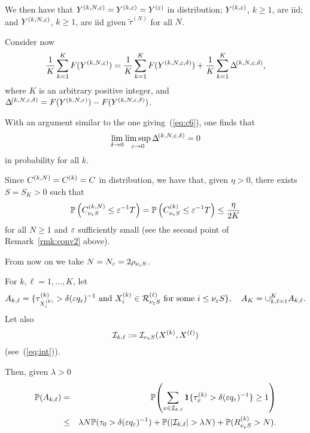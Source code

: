 We then have that $Y^{(k,N,\varepsilon)}=Y^{(k,\varepsilon)}=Y^{(\varepsilon)}$ in distribution; $Y^{(k,\varepsilon)}$, $k\geq1$, are iid; and 
$Y^{(k,N,\varepsilon)}$, $k\geq1$, are iid given   $\tilde\tau^{(N)}$ for all $N$.



Consider now
\begin{equation}
\label{eq:av1}
\frac1{K}\sum_{k=1}^{K}F(\ykne)=\frac1{K}\sum_{k=1}^{K}F(\ykned)
+\frac1{K}\sum_{k=1}^{K}\rkned,
\end{equation}
where $K$ is an arbitrary positive integer, and $\Delta^{\!(k,N,\varepsilon,\delta)}=F(Y^{(k,N,\varepsilon)})-F(Y^{(k,N,\varepsilon,\delta)})$.

With an argument similar to the one giving~(\ref{eq:c6}), one finds that 
\begin{equation}
\label{eq:av2}
\lim_{\d\to0}\limsup_{\eps\to0}\rkned=0
\end{equation}
in probability for all $k$.


Since $C^{(k,N)}=C^{(k)}=C$ in distribution, we have that, given $\eta>0$, there exists $S=S_K>0$ such that 
\begin{equation}
\label{eq:av3}
\P\left(\ckn_{\nu_\eps S}\leq\eps^{-1}T\right)=\P\left(\ck_{\nu_\eps S}\leq\eps^{-1}T\right)\leq\frac\eta{2K}
\end{equation}
for all $N\geq1$ and $\varepsilon$ sufficiently small (see the second point of Remark~\ref{rmk:conv2} above).

From now on we take $N=N_\varepsilon=2\rho_{\nu_\varepsilon S}$. 


For $k,\ell=1,\ldots,K$, let
\begin{equation}
\label{eq:av5}
A_{k,\ell}=\{\tk_{\xk_i}>\d (\eps q_\eps)^{-1}\mbox{ and }\xk_i\in\rl_{\nu_\eps S}\mbox{ for some }i\leq \nu_\eps S\},\quad
A_K=\cup_{k,\ell=1}^KA_{k,\ell}.
\end{equation}
Let also 
\begin{equation}
\label{eq:av6}
\I_{k,\ell}:=\I_{\nu_\eps S}(\xk,\xl)
\end{equation}
(see~(\ref{eq:int})).

Then, given $\lambda>0$
\begin{eqnarray}\nn
\P(A_{k,\ell})\=
\P\!\left(\sum_{x\in\I_{k,\ell}}\1\{\tk_x>\d (\eps q_\eps)^{-1}\}\geq1\right)\\
\label{eq:av7}
&\leq&\lambda N\P(\tau_0>\d (\eps q_\eps)^{-1})+\P(|\I_{k,\ell}|>\lambda N)+\P(R_{\nu_\eps S}^{(k)}>N).
\end{eqnarray}

